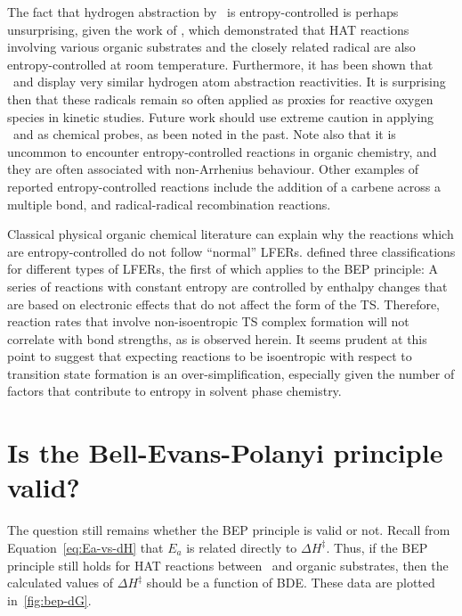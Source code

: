 The fact that hydrogen abstraction by \cumo\ is entropy-controlled is perhaps unsurprising, given the work of \citet{Finn2004}, which demonstrated that HAT reactions involving various organic substrates and the closely related radical  are also entropy-controlled at room temperature. Furthermore, it has been shown that \cumo\ and  display very similar hydrogen atom abstraction reactivities.\cite{Salamone2011, Valgimigli1995, Sheeller2001, Baignee1983} It is surprising then that these radicals remain so often applied as proxies for reactive oxygen species in kinetic studies. Future work should use extreme caution in applying \cumo\ and  as chemical probes, as been noted in the past.\cite{Finn2004, Salamone2011b, Salamone2011} Note also that it is uncommon to encounter entropy-controlled reactions in organic chemistry, and they are often associated with non-Arrhenius behaviour. Other examples of reported entropy-controlled reactions include the addition of a carbene across a multiple bond,\cite{Houk1984, Moss2017} and radical-radical recombination reactions.\cite{Sobek2001}

Classical physical organic chemical literature can explain why the reactions which are entropy-controlled do not follow ``normal'' LFERs.\cite{Exner1973} \citet{Blackadder1958} defined three classifications for different types of LFERs, the first of which applies to the BEP principle: A series of reactions with constant entropy are controlled by enthalpy changes that are based on electronic effects that do not affect the form of the TS. Therefore, reaction rates that involve non-isoentropic TS complex formation will not correlate with bond strengths, as is observed herein. It seems prudent at this point to suggest that expecting reactions to be isoentropic with respect to transition state formation is an over-simplification, especially given the number of factors that contribute to entropy in solvent phase chemistry.

\section{Is the Bell-Evans-Polanyi principle valid?}

The question still remains whether the BEP principle is valid or not. Recall from Equation~\ref{eq:Ea-vs-dH} that $E_a$ is related directly to $\Delta H^\ddagger$. Thus, if the BEP principle still holds for HAT reactions between \cumo\ and organic substrates, then the calculated values of $\Delta H^\ddagger$ should be a function of  BDE. These data are plotted in~\ref{fig:bep-dG}.

